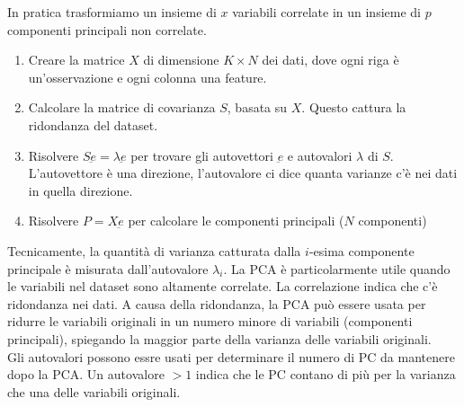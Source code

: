 \documentclass{../main.tex}[subfiles]
\begin{document}
In pratica trasformiamo un insieme di $x$ variabili correlate in un insieme di $p$ componenti principali non correlate.
\begin{enumerate}
	\item Creare la matrice $X$ di dimensione $K \times N$ dei dati, dove ogni riga è un'osservazione e ogni colonna una feature.
	\item Calcolare la matrice di covarianza $S$, basata su $X$. Questo cattura la ridondanza del dataset.
	\item Risolvere $S\underbar{e}=\lambda \underbar{e}$ per trovare gli autovettori $\underbar{e}$ e autovalori $\lambda$ di $S$. L'autovettore è una direzione, l'autovalore ci dice quanta varianze c'è nei dati in quella direzione.
	\item Risolvere $P=X\underbar{e}$ per calcolare le componenti principali ($N$ componenti)
\end{enumerate}
Tecnicamente, la quantità di varianza catturata dalla $i$-esima componente principale è misurata dall'autovalore $\lambda_i$.
La PCA è particolarmente utile quando le variabili nel dataset sono altamente correlate.
La correlazione indica che c'è ridondanza nei dati. A causa della ridondanza, la PCA può essere usata per ridurre le variabili originali in un numero minore di variabili (componenti principali), spiegando la maggior parte della varianza delle variabili originali.
\\
Gli autovalori possono essre usati per determinare il numero di PC da mantenere dopo la PCA.
Un autovalore $>1$ indica che le PC contano di più per la varianza che una delle variabili originali.
\end{document}
